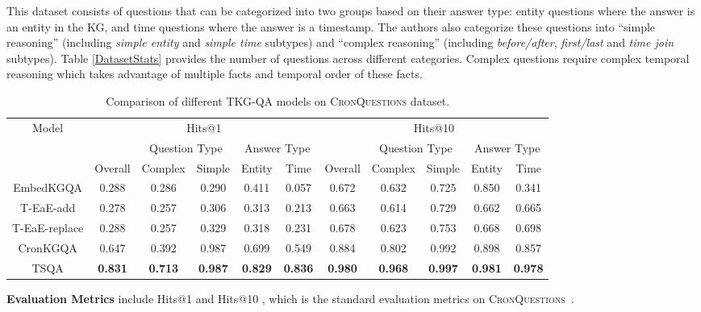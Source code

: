 \documentclass[11pt]{article}
\newcommand{\xhdrnd}[1]{{\noindent\bfseries #1}}
\begin{document}
This dataset consists of questions that can be categorized into two groups based on their answer type: entity questions where the answer is an entity in the KG, and time questions where the answer is a timestamp.
The authors also categorize these questions into ``simple reasoning'' (including \textit{simple entity} and \textit{simple time} subtypes) and ``complex reasoning'' (including \textit{before/after}, \textit{first/last} and \textit{time join} subtypes). 
Table \ref{DatasetStats} provides the number of questions across different categories. Complex questions require complex temporal reasoning which takes advantage of multiple facts and temporal order of these facts.

\begin{table*}[!ht]
    \centering
    \small
    \begin{tabular}{c||c|c|c|c|c||c|c|c|c|c}
      \hline
      \multirow{3}{4em}{Model}  &  \multicolumn{5}{c||}{Hits@1} &  \multicolumn{5}{c}{Hits@10}  \\ 
\cline{2-11}
       &  & \multicolumn{2}{c|}{Question Type}& \multicolumn{2}{c||}{Answer Type} &  & \multicolumn{2}{c|}{Question Type}& \multicolumn{2}{c}{Answer Type}\\
\cline{2-11}
       & Overall & Complex & Simple & Entity & Time & Overall & Complex & Simple & Entity & Time  \\ \hline 
EmbedKGQA & 0.288 & 0.286 & 0.290 & 0.411 & 0.057 & 0.672 & 0.632 & 0.725 & 0.850 & 0.341 \\
      T-EaE-add & 0.278 &0.257& 0.306& 0.313& 0.213& 0.663& 0.614& 0.729& 0.662& 0.665 \\
      T-EaE-replace & 0.288 &0.257& 0.329& 0.318& 0.231& 0.678& 0.623& 0.753& 0.668& 0.698 \\
      CronKGQA & 0.647 & 0.392 & 0.987 & 0.699 & 0.549 & 0.884 & 0.802 & 0.992 & 0.898 & 0.857 \\
\hline
TSQA & \textbf{0.831} & \textbf{0.713} & \textbf{0.987} & \textbf{0.829} & \textbf{0.836} & \textbf{0.980} & \textbf{0.968} & \textbf{0.997} & \textbf{0.981} & \textbf{0.978} \\
      \hline
    \end{tabular} 
    \caption{Comparison of different TKG-QA models on \textsc{CronQuestions} dataset.}
    \label{ResultsTable2}
\end{table*}

\smallskip
\xhdrnd{Evaluation Metrics} include Hits@1 and Hits@10 , which is the standard evaluation metrics on \textsc{CronQuestions}~\cite{saxena2021question}.
\end{document}
